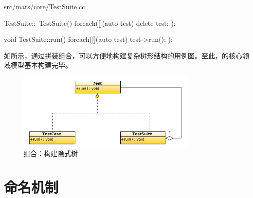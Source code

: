 \begin{content}
\begin{diff}{src/mars/core/TestSuite.cc}
\begin{minicpp}
TestSuite::~TestSuite() {
  foreach([](auto test) {
    delete test;
  });
}

void TestSuite::run() {
  foreach([](auto test) {
    test->run();
  });
}
 \end{minicpp}
\end{diff}

如所示，通过拼装组合，可以方便地构建复杂树形结构的用例图。至此，的核心领域模型基本构建完毕。

\begin{figure}
\centering
\includegraphics[width=0.8\textwidth]{figures/xunit/test-tree.png}
\caption{组合：构建隐式树}
 \label{fig:test-tree}
\end{figure}

\end{content}

\section{命名机制}

